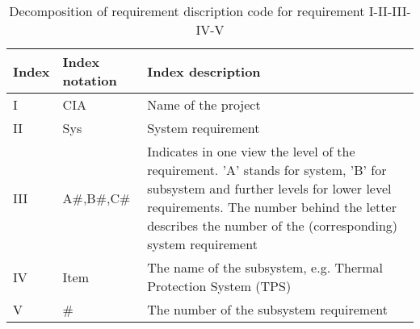 \begin{table}[H]
\vspace{-4mm}
    \caption {Decomposition of requirement discription code for requirement I-II-III-IV-V}
    \begin{tabular}{|p{}|p{}|p{}|}
    \hline
    Index & Index notation   & Index description                                                                                                                                  \\ \hline \hline
    I            & CIA                     & Name of the project                                                                                                                           \\ \hline
    II           & Sys                     & System requirement                                                                                                                           \\ \hline
    III            & A\#,B\#,C\#                & Indicates in one view the level of the requirement. 'A' stands for system, 'B' for subsystem  and further levels for lower level requirements. The number behind the letter describes the number of the (corresponding) system requirement
\\ \hline
    IV            & Item                    & The name of the subsystem, e.g. Thermal Protection System (TPS)                                                                                                 \\ \hline
    V            & \#			           & The number of the subsystem requirement                                                                                                      \\ \hline
    \end{tabular}
    \label{tab:description}
\end{table}

